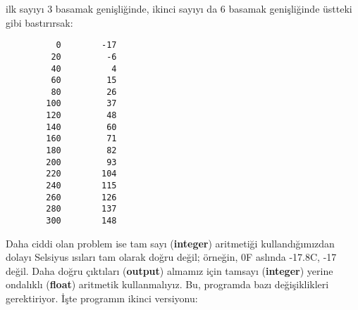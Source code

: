 \documentclass[a4paper,12pt,oneside]{book}
\begin{document}
ilk sayıyı 3 basamak genişliğinde, ikinci sayıyı da 6 basamak genişliğinde üstteki gibi bastırırsak:
\begin{lstlisting}
          0        -17
         20         -6
         40          4
         60         15
         80         26
        100         37
        120         48
        140         60
        160         71
        180         82
        200         93
        220        104
        240        115
        260        126
        280        137
        300        148
\end{lstlisting}
\par Daha ciddi olan problem ise tam sayı (\textbf{integer}) aritmetiği kullandığımızdan dolayı Selsiyus ısıları tam olarak doğru değil; örneğin, 0\degree F aslında -17.8\degree C, -17 değil. Daha doğru çıktıları (\textbf{output}) almamız için tamsayı (\textbf{integer}) yerine ondalıklı (\textbf{float}) aritmetik kullanmalıyız. Bu, programda bazı değişiklikleri gerektiriyor. İşte programın ikinci versiyonu: \pagebreak
\end{document}
